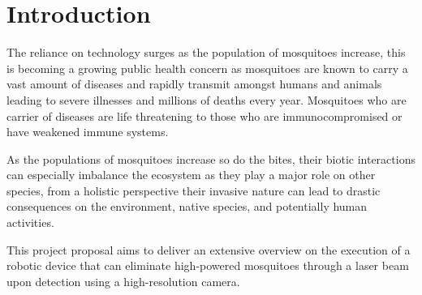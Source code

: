 \documentclass[11pt]{article}
\begin{document}
	
	
	\newpage
	\section{Introduction}
	
	The reliance on technology surges as the population of mosquitoes increase, this is becoming a growing public health concern as mosquitoes are known to carry a vast amount of diseases and rapidly transmit amongst humans and animals leading to severe illnesses and millions of deaths every year. Mosquitoes who are carrier of diseases are life threatening to those who are immunocompromised or have weakened immune systems.
	
	
	As the populations of mosquitoes increase so do the bites, their biotic %
	 interactions can especially imbalance the ecosystem as they play a major role on other species, from a holistic perspective their invasive nature can lead to drastic consequences on the environment, native species, and potentially human activities.
	 
	 	This project proposal aims to deliver an extensive overview on the execution of a robotic device that can eliminate high-powered mosquitoes through a laser beam upon detection using a high-resolution camera. 
	
	
\end{document}
